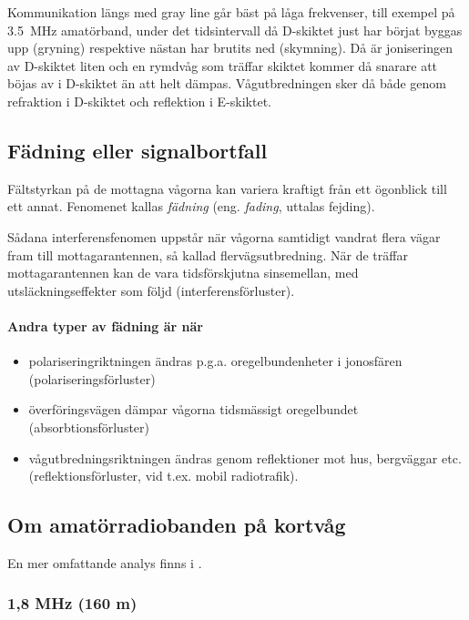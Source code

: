 Kommunikation längs med gray line går bäst på låga frekvenser, till exempel på
\qty{3,5}{\mega\hertz} amatörband, under det tidsintervall då D-skiktet just
har börjat byggas upp (gryning) respektive nästan har brutits ned (skymning).
Då är joniseringen av D-skiktet liten och en rymdvåg som
träffar skiktet kommer då snarare att böjas av i D-skiktet än att helt dämpas.
Vågutbredningen sker då både genom refraktion i D-skiktet och reflektion i
E-skiktet.

\subsection{Fädning eller signalbortfall}
\label{fädning}

Fältstyrkan på de mottagna vågorna kan variera kraftigt från ett ögonblick till
ett annat.
Fenomenet kallas \emph{fädning} (eng. \emph{fading}, uttalas fejding).

Sådana interferensfenomen uppstår när vågorna samtidigt vandrat flera
vägar fram till mottagarantennen, så kallad flervägsutbredning.
När de träffar mottagarantennen kan de vara tidsförskjutna sinsemellan, med
utsläckningseffekter som följd (interferensförluster).

\newpage %
\paragraph{Andra typer av fädning är när}
\begin{itemize}
\item polariseringriktningen ändras p.g.a. oregelbundenheter i
  jonosfären (polariseringsförluster)
\item överföringsvägen dämpar vågorna tidsmässigt oregelbundet
  (absorbtionsförluster)
\item vågutbredningsriktningen ändras genom reflektioner mot hus,
  bergväggar etc. (reflektionsförluster, vid t.ex. mobil radiotrafik).
\end{itemize}

\subsection{Om amatörradiobanden på kortvåg}
\label{om_kortvågsbanden}

En mer omfattande analys finns i \cite{ARRLHDB2015}.

\subsubsection{1,8 MHz (160 m)}

